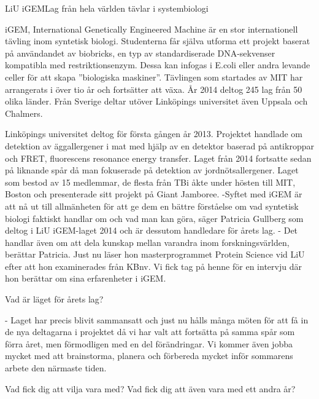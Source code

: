 \begin{news}{2}{LiU iGEM}{Lag från hela världen tävlar i systembiologi}{}{}

iGEM, International Genetically Engineered Machine är en stor
internationell tävling inom syntetisk biologi. Studenterna får själva
utforma ett projekt baserat på användandet av biobricks, en typ av
standardiserade DNA-sekvenser kompatibla med restriktionsenzym. Dessa
kan infogas i E.coli eller andra levande celler för att skapa
”biologiska maskiner”. Tävlingen som startades av MIT har arrangerats
i över tio år och fortsätter att växa. År 2014 deltog 245 lag från 50
olika länder. Från Sverige deltar utöver Linköpings universitet även
Uppsala och Chalmers.





Linköpings universitet deltog för första gången år 2013. Projektet
handlade om detektion av äggallergener i mat med hjälp av en detektor
baserad på antikroppar och FRET, fluorescens resonance energy
transfer. Laget från 2014 fortsatte sedan på liknande spår då man
fokuserade på detektion av jordnötsallergener. Laget som bestod av 15
medlemmar, de flesta från TBi åkte under hösten till MIT, Boston och
presenterade sitt projekt på Giant Jamboree.  -Syftet med iGEM är att
nå ut till allmänheten för att ge dem en bättre förståelse om vad
syntetisk biologi faktiskt handlar om och vad man kan göra, säger
Patricia Gullberg som deltog i LiU iGEM-laget 2014 och är dessutom
handledare för årets lag.  - Det handlar även om att dela kunskap
mellan varandra inom forskningsvärlden, berättar Patricia. Just nu
läser hon masterprogrammet Protein Science vid LiU efter att hon
examinerades från KBnv. Vi fick tag på henne för en intervju där hon
berättar om sina erfarenheter i iGEM.

Vad är läget för årets lag?

- Laget har precis blivit sammansatt och just nu hålls många möten för
  att få in de nya deltagarna i projektet då vi har valt att fortsätta
  på samma spår som förra året, men förmodligen med en del
  förändringar. Vi kommer även jobba mycket med att brainstorma,
  planera och förbereda mycket inför sommarens arbete den närmaste
  tiden.

Vad fick dig att vilja vara med? Vad fick dig att även vara med ett andra år?


\end{news}
